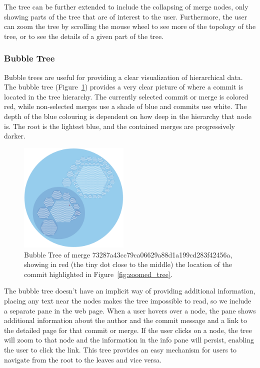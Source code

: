 \documentclass[conference, draftclsnofoot, draft]{IEEEtran}
\begin{document}
The tree can be further extended to include the collapsing of merge nodes, only
showing parts of the tree that are of interest to the user. Furthermore, the user can
zoom the tree by scrolling the mouse wheel to see more of the topology of the tree,
or to see the details of a given part of the tree.

\subsubsection{Bubble Tree}

Bubble trees are useful for providing a clear visualization of hierarchical
data\cite{Boardman2000}. The bubble tree (Figure~\ref{fig:bubble_tree}) provides a
very clear picture of where a commit is located in the tree hierarchy. The currently
selected commit or merge is colored red, while non-selected merges use a shade of
blue and commits use white.  The depth of the blue colouring is dependent on how
deep in the hierarchy that node is. The root is the lightest blue, and the contained
merges are progressively darker.

\begin{figure}
        \centering
        \includegraphics[width=0.47\textwidth]{figures/bubble_tree.pdf}
        \caption{Bubble Tree of merge 73287a43cc79ca06629a88d1a199cd283f42456a,
                showing in red (the tiny dot close to the middle) the location of
                the commit highlighted in Figure~\ref{fig:zoomed_tree}.}
        \label{fig:bubble_tree}
\end{figure}

The bubble tree doesn't have an implicit way of providing additional information,
placing any text near the nodes makes the tree impossible to read, so we include a
separate pane in the web page. When a user hovers over a node, the pane shows
additional information about the author and the commit message and a link to the
detailed page for that commit or merge. If the user clicks on a node, the tree will
zoom to that node and the information in the info pane will persist, enabling the
user to click the link. This tree provides an easy mechanism for users to navigate
from the root to the leaves and vice versa.
\end{document}
